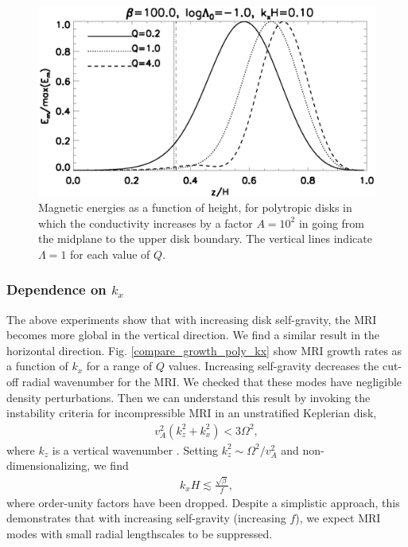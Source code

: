 \begin{figure}
  \includegraphics[width=\linewidth]{figures/compare_results_poly_layer_amp100}
  \caption{Magnetic energies as a function of height, for polytropic disks
    in which the conductivity increases by a
    factor $A=10^2$ in going from the midplane to the upper disk
    boundary. The vertical lines indicate $\Lambda=1$ for each value 
    of $Q$.
    \label{poly_layer}}
\end{figure}

\subsubsection{Dependence on $k_x$}
The above experiments show that with increasing 
disk self-gravity, the MRI becomes more global in the vertical
direction. We find a similar result in the horizontal direction. 
Fig. \ref{compare_growth_poly_kx} show MRI growth rates as a
function of $k_x$ for a range of $Q$ values. Increasing self-gravity
decreases the cut-off radial wavenumber for the MRI. We checked
that these modes have negligible density perturbations. Then we can 
understand this result by invoking the instability criteria for  
incompressible MRI in an unstratified Keplerian disk,
\begin{align}
  v_A^2(k_z^2 + k_x^2) < 3\Omega^2,
\end{align}
where $k_z$ is a vertical wavenumber \citep{kim00}. Setting $k_z^2\sim
\Omega^2/v_A^2$ and non-dimensionalizing, we find
\begin{align} 
  k_xH \lesssim \frac{\sqrt{\beta}}{f},
\end{align}
where order-unity factors have been dropped. Despite a simplistic
approach, this demonstrates that with increasing self-gravity
(increasing $f$), we expect MRI modes with small radial
lengthscales to be suppressed.   


